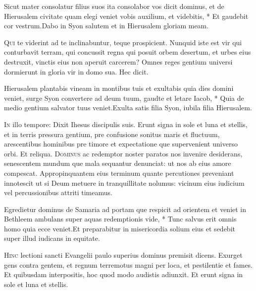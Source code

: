 \begin{multicols*}{2}
\begin{responsory}
{Sicut mater consolatur filius suos ita consolabor vos dicit dominus, et de Hierusalem civitate quam elegi veniet vobis auxilium, et videbitis, * Et gaudebit cor vestrum.}{Dabo in Syon salutem et in Hierusalem gloriam meam.}
\end{responsory}
\lettrine[lines=2]{\zallmancaps \color{Blue} Q}{ui} te viderint ad te inclinabuntur, teque prospicient. Nunquid iste est vir qui conturbavit terram, qui concussit regna qui posuit orbem desertum, et urbes eius destruxit, vinctis eius non aperuit carcerem? Omnes reges gentium universi dormierunt in gloria vir in domo sua. Hec dicit.
\begin{responsory-doxology}
{Hierusalem plantabis vineam in montibus tuis et exultabis quia dies domini veniet, surge Syon convertere ad deum tuum, gaudte et letare Iacob, * Quia de medio gentium salvator tuus veniet.}{Exulta satis filia Syon, iubila filia Hierusalem.}
\end{responsory-doxology}
\lettrine[lines=2]{\zallmancaps \color{Red} I}{n} illo tempore: Dixit Ihesus discipulis suis. Erunt signa in sole et luna et stellis, et in terris pressura gentium, pre confusione sonitus maris et fluctuum, arescentibus hominibus pre timore et expectatione que supervenient universo orbi. Et reliqua.
\lettrine[lines=2]{\zallmancaps \color{Blue} D}{ominus} ac redemptor noster paratos nos invenire desiderans, senescentem mundum que mala sequantur denunciat: ut nos ab eius amore compescat. Appropinquantem eius terminum quante percutiones preveniant innotescit ut si Deum metuere in tranquillitate nolumus: vicinum eius iudicium vel percussionibus attriti timeamus.
\begin{responsory}
{Egredietur dominus de Samaria ad portam que respicit ad orientem et veniet in Bethleem ambulans super aquas redemptionis vide, * Tunc salvus erit omnis homo quia ecce veniet.}{Et preparabitur in misericordia solium eius et sedebit super illud iudicans in equitate.}
\end{responsory}
\lettrine[lines=2]{\zallmancaps \color{Red} H}{inc} lectioni sancti Evangelii paulo superius dominus premisit dicens. Exurget gens contra gentem, et regnum terremotus magni per loca, et pestilentie et fames. Et quibusdam interpositis, hoc quod modo audistis adiunxit. Et erunt signa in sole et luna et stellis.

\end{multicols*}

